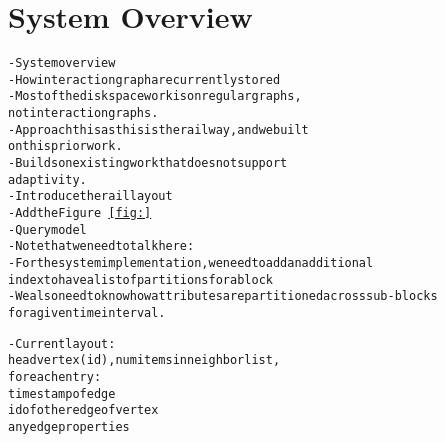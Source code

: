 \section{System Overview}\label{sec:system}
\begin{alltt}\scriptsize
- System overview
    - How interaction graph are currently stored
        - Most of the disk space work is on regular graphs, 
           not interaction graphs. 
        - Approach this as this is the railway, and we built
           on this prior work.
        - Builds on existing work that does not support 
          adaptivity.
    - Introduce the rail layout
    - Add the Figure~\ref{fig:}
    - Query model
   - Note that we need to talk here:
    - For the system implementation, we need to add an additional
       index to have a list of partitions for a block
   - We also need to know how attributes are partitioned across sub-blocks 
      for a given time interval.

    - Current layout:
    head vertex (id), num items in neighbor list, 
    for each entry:
        timestamp of edge
        id of other edge of vertex
        any edge properties

\end{alltt}
